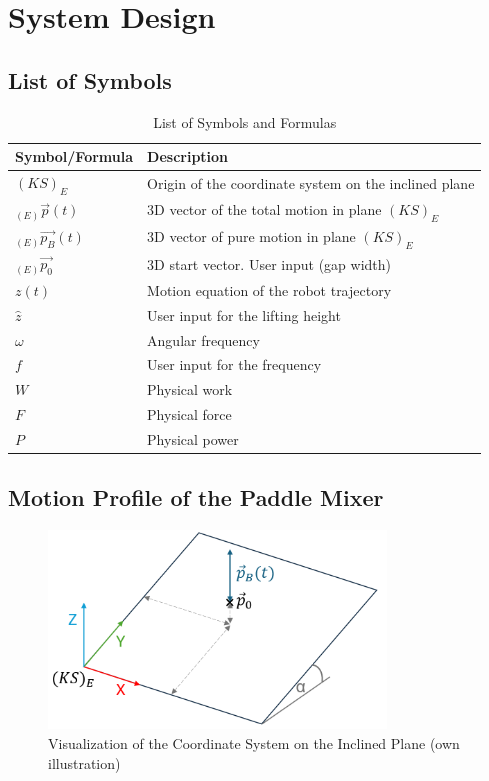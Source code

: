 \chapter{System Design}

\section{List of Symbols}


\begin{table}[htbp]
    \centering
    \begin{tabular}{l l}
        \hline
        \textbf{Symbol/Formula} & \textbf{Description} \\
        \hline
        \((KS)_E\) & Origin of the coordinate system on the inclined plane \\
        \( _{(E)}\vec{p}(t) \) & 3D vector of the total motion in plane \((KS)_E\)\\
        \(_{(E)}\vec{p_B} (t) \) & 3D vector of pure motion in plane \((KS)_E\) \\
        \(_{(E)}\vec{p_0}\) & 3D start vector. User input (gap width)\\
        \(z(t)\) & Motion equation of the robot trajectory \\
        \(\hat{z}\) & User input for the lifting height\\
        \(\omega\) & Angular frequency \\
        \(f\) & User input for the frequency \\
        \(W\) & Physical work \\
        \(F\) & Physical force \\
        \(P\) & Physical power \\
        \hline
    \end{tabular}
    \caption{List of Symbols and Formulas}
\end{table}

\section{Motion Profile of the Paddle Mixer}

\begin{figure}[h]
    \centering
    \includegraphics[width=0.8\textwidth]{bilder/KS_E-Koordinatensystem_Ebene.png}
    \caption[Visualization of the Coordinate System on the Inclined Plane]{Visualization of the Coordinate System on the Inclined Plane (own illustration)}\label{fig:VisualizationCoordinateSystemInclinedPlane}
\end{figure}

